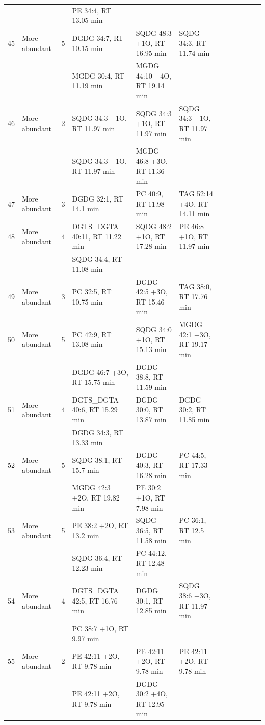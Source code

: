 \begin{landscape}
\begin{footnotesize}
\begin{singlespace}
\begin{flushleft}
\begin{longtable}{ Lp{.03\linewidth} Lp{.12\linewidth} Lp{.03\linewidth} Lp{.24\linewidth} Lp{.24\linewidth} Lp{.24\linewidth} }
 &  &  & PE 34:4, RT 13.05 min &  &  \\
45 & More abundant & 5 & DGDG 34:7, RT 10.15 min & SQDG 48:3 +1O, RT 16.95 min & SQDG 34:3, RT 11.74 min \\
 &  &  & MGDG 30:4, RT 11.19 min & MGDG 44:10 +4O, RT 19.14 min &  \\
46 & More abundant & 2 & SQDG 34:3 +1O, RT 11.97 min & SQDG 34:3 +1O, RT 11.97 min & SQDG 34:3 +1O, RT 11.97 min \\
 &  &  & SQDG 34:3 +1O, RT 11.97 min & MGDG 46:8 +3O, RT 11.36 min &  \\
47 & More abundant & 3 & DGDG 32:1, RT 14.1 min & PC 40:9, RT 11.98 min & TAG 52:14 +4O, RT 14.11 min \\
48 & More abundant & 4 & DGTS\_DGTA 40:11, RT 11.22 min & SQDG 48:2 +1O, RT 17.28 min & PE 46:8 +1O, RT 11.97 min \\
 &  &  & SQDG 34:4, RT 11.08 min &  &  \\
49 & More abundant & 3 & PC 32:5, RT 10.75 min & DGDG 42:5 +3O, RT 15.46 min & TAG 38:0, RT 17.76 min \\
50 & More abundant & 5 & PC 42:9, RT 13.08 min & SQDG 34:0 +1O, RT 15.13 min & MGDG 42:1 +3O, RT 19.17 min \\
 &  &  & DGDG 46:7 +3O, RT 15.75 min & DGDG 38:8, RT 11.59 min &  \\
51 & More abundant & 4 & DGTS\_DGTA 40:6, RT 15.29 min & DGDG 30:0, RT 13.87 min & DGDG 30:2, RT 11.85 min \\
 &  &  & DGDG 34:3, RT 13.33 min &  &  \\
52 & More abundant & 5 & SQDG 38:1, RT 15.7 min & DGDG 40:3, RT 16.28 min & PC 44:5, RT 17.33 min \\
 &  &  & MGDG 42:3 +2O, RT 19.82 min & PE 30:2 +1O, RT 7.98 min &  \\
53 & More abundant & 5 & PE 38:2 +2O, RT 13.2 min & SQDG 36:5, RT 11.58 min & PC 36:1, RT 12.5 min \\
 &  &  & SQDG 36:4, RT 12.23 min & PC 44:12, RT 12.48 min &  \\
54 & More abundant & 4 & DGTS\_DGTA 42:5, RT 16.76 min & DGDG 30:1, RT 12.85 min & SQDG 38:6 +3O, RT 11.97 min \\
 &  &  & PC 38:7 +1O, RT 9.97 min &  &  \\
55 & More abundant & 2 & PE 42:11 +2O, RT 9.78 min & PE 42:11 +2O, RT 9.78 min & PE 42:11 +2O, RT 9.78 min \\
 &  &  & PE 42:11 +2O, RT 9.78 min & DGDG 30:2 +4O, RT 12.95 min &  \\

\end{longtable}
\end{flushleft}
\end{singlespace}
\end{footnotesize}
\end{landscape}
